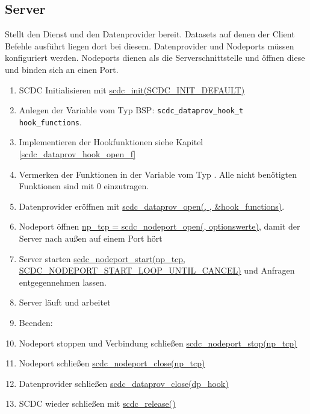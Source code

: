 \subsection{Server}
Stellt den Dienst und den Datenprovider bereit.
Datasets auf denen der Client Befehle ausführt liegen dort bei diesem.
Datenprovider und Nodeports müssen konfiguriert werden.
Nodeports dienen als die Serverschnittstelle und öffnen diese und binden sich an einen Port.

\begin{enumerate}
	\item SCDC Initialisieren mit \hyperref[scdc_init]{scdc\_init(SCDC\_INIT\_DEFAULT)}
	\item Anlegen der Variable vom Typ  BSP: \texttt{scdc\_dataprov\_hook\_t hook\_functions}.
	\item Implementieren der Hookfunktionen siehe Kapitel \ref{scdc_dataprov_hook_open_f}
	\item Vermerken der Funktionen in der Variable vom Typ . Alle nicht benötigten Funktionen sind mit 0 einzutragen.
	\item Datenprovider eröffnen mit \hyperref[scdc_dataprov_open]{scdc\_dataprov\_open(, , \&hook\_functions)}.
	\item Nodeport öffnen \hyperref[scdc_nodeport_open]{np\_tcp = scdc\_nodeport\_open(, optionswerte)}, damit der Server nach außen auf einem Port hört
	\item Server starten \hyperref[scdc_nodeport_start]{scdc\_nodeport\_start(np\_tcp, SCDC\_NODEPORT\_START\_LOOP\_UNTIL\_CANCEL)} und Anfragen entgegennehmen lassen.
	\item Server läuft und arbeitet
	\item Beenden: 
	\item Nodeport stoppen und Verbindung schließen \hyperref[scdc_nodeport_stop]{scdc\_nodeport\_stop(np\_tcp)}
	\item Nodeport schließen \hyperref[scdc_nodeport_close]{scdc\_nodeport\_close(np\_tcp)}
	\item Datenprovider schließen \hyperref[scdc_dataprov_close]{scdc\_dataprov\_close(dp\_hook)}
	\item SCDC wieder schließen mit \hyperref[scdc_release]{scdc\_release()}
\end{enumerate}



